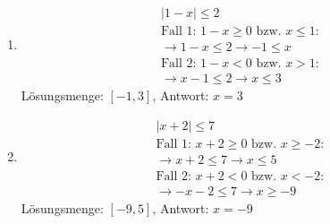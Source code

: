 \begin{enumerate}[label=\alph*)]
  \item \begin{align*}
      &\left|1 - x\right| \leq 2\\
      &\text{Fall 1: } 1 - x \geq 0 \text{ bzw. } x \leq 1:\\
      &\rightarrow 1 - x \leq 2 \rightarrow -1 \leq x\\
      &\text{Fall 2: } 1 - x < 0 \text{ bzw. } x > 1:\\
      &\rightarrow x - 1 \leq 2 \rightarrow x \leq 3
    \end{align*}
    Lösungsmenge: $[-1, 3]$, Antwort: $x = 3$
  \item \begin{align*}
      &\left|x + 2\right| \leq 7\\
      &\text{Fall 1: } x + 2 \geq 0 \text{ bzw. } x \geq -2:\\
      &\rightarrow x + 2 \leq 7 \rightarrow x \leq 5\\
      &\text{Fall 2: } x + 2 < 0 \text{ bzw. } x < -2:\\
      &\rightarrow -x - 2 \leq 7 \rightarrow x \geq -9
    \end{align*}
    Lösungsmenge: $[-9, 5]$, Antwort: $x = -9$
\end{enumerate}

